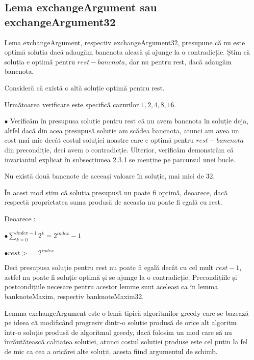     \subsection{Lema exchangeArgument sau exchangeArgument32}
    Lema exchangeArgument, respectiv exchangeArgument32, presupune că nu este optimă soluția dacă adaugăm bancnota aleasă și ajunge la o contradicție.
    Știm că soluția e optimă pentru $rest - bancnota$, dar nu pentru rest, dacă adaugăm bancnota.\par
    Consideră că există o altă soluție optimă pentru rest.\par
    Următoarea verificare este specifică cazurilor $1,2,4,8,16$.\par
    $\bullet $ Verificăm în presupusa soluție pentru rest că nu avem bancnota în soluție deja, altfel dacă din acea presupusă 
     solutie am scădea bancnota, atunci am avea un cost mai mic decât costul soluției noastre care e optimă pentru 
     $rest - bancnota$ din precondiție, deci avem o contradicție.
    Ulterior, verificăm demonstrăm că invariantul explicat în subsecțiunea 2.3.1 se menține pe parcursul unei bucle.\par
    Nu există două bancnote de aceeași valoare în soluție, mai mici de 32.\par
    În acest mod știm că soluția presupusă nu poate fi optimă, deoarece, dacă respectă proprietatea
    suma produsă de aceasta nu poate fi egală cu rest. \par
    Deoarece :\par
    $\bullet \sum_{k=0}^{index-1} 2^{k} = 2^{index}-1 $\par
    $\bullet rest > = 2^{index} $ \par
    Deci presupusa soluție pentru rest nu poate fi egală decât cu cel mult $rest- 1$, astfel nu poate fi soluție optimă și se ajunge la o contradicție. 
    Precondițiile și postcondițiile necesare pentru acestor lemme sunt aceleași ca în lemma banknoteMaxim, respectiv banknoteMaxim32.\par
    Lemma exchangeArgument este o lemă tipică algoritmilor greedy care se bazează pe ideea că modificând progresiv 
    dintr-o soluție produsă de orice alt algoritm într-o soluție produsă de algoritmul greedy, dacă folosim un mod 
    care să nu înrăutățească calitatea soluției, atunci costul soluției produse este cel puțin la fel de mic ca 
    cea a oricărei alte soluții, acesta fiind argumentul de schimb.\par
